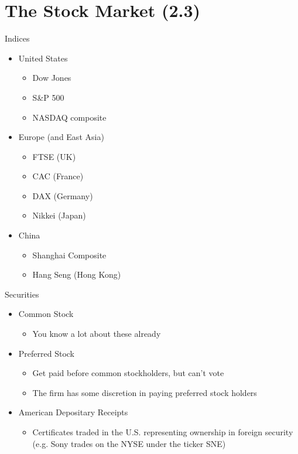 \documentclass{beamer}
\begin{document}
\section{The Stock Market (2.3)}

\begin{frame}{Indices}
	\begin{itemize}
		\item United States
		\begin{itemize}
			\item Dow Jones 
			\item S\&P 500
			\item NASDAQ composite
		\end{itemize}
		\item Europe (and East Asia)
		\begin{itemize}
			\item FTSE (UK)
			\item CAC (France)
			\item DAX (Germany)
			\item Nikkei (Japan)
		\end{itemize}
		\item China
		\begin{itemize}
			\item Shanghai Composite
			\item Hang Seng (Hong Kong)
		\end{itemize}
	\end{itemize}
\end{frame}

\begin{frame}{Securities}
	\begin{itemize}
		\item Common Stock
	\begin{itemize}
		\item You know a lot about these already
	\end{itemize} 
		\item Preferred Stock
	\begin{itemize}
		\item Get paid before common stockholders, but can't vote
		\item The firm has some discretion in paying preferred stock holders
	\end{itemize} 
		\item American Depositary Receipts
	\begin{itemize}
		\item Certificates traded in the U.S. representing ownership in foreign security (e.g. Sony trades on the NYSE under the ticker SNE)
	\end{itemize}
	\end{itemize}
\end{frame}
\end{document}
